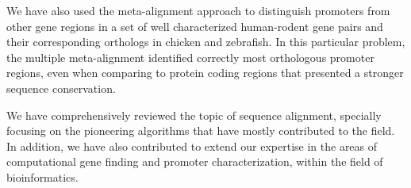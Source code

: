 \begin{menumerate}
\item
We have also used the meta-alignment approach to distinguish promoters from other 
gene regions in a set of well characterized human-rodent gene pairs and their corresponding 
orthologs in chicken and zebrafish. In this particular problem, the multiple meta-alignment 
identified correctly most orthologous promoter regions, even when comparing to protein coding
regions that presented a stronger sequence conservation.

\item
We have comprehensively reviewed the topic of sequence alignment, specially focusing on the 
pioneering algorithms that have mostly contributed to the field. In addition, we have also 
contributed to extend our expertise in the areas of computational gene finding and promoter 
characterization, within the field of bioinformatics.
\end{menumerate}

